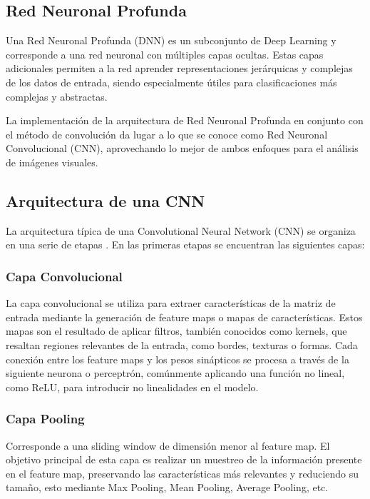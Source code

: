 \documentclass[journal]{IEEEtai}
\begin{document}
\subsection{Red Neuronal Profunda}

Una Red Neuronal Profunda (DNN) es un subconjunto de Deep Learning y corresponde a una red neuronal con múltiples capas ocultas. Estas capas adicionales permiten a la red aprender representaciones jerárquicas y complejas de los datos de entrada, siendo especialmente útiles para clasificaciones más complejas y abstractas.

La implementación de la arquitectura de Red Neuronal Profunda en conjunto con el método de convolución da lugar a lo que se conoce como Red Neuronal Convolucional (CNN), aprovechando lo mejor de ambos enfoques para el análisis de imágenes visuales.

\subsection{Arquitectura de una CNN}

La arquitectura típica de una Convolutional Neural Network (CNN) se organiza en una serie de etapas \cite{CNN}\cite{IntroCNN}. En las primeras etapas se encuentran las siguientes capas:

\subsubsection{\textbf{Capa Convolucional}} La capa convolucional se utiliza para extraer características de la matriz de entrada mediante la generación de feature maps o mapas de características. Estos mapas son el resultado de aplicar filtros, también conocidos como kernels, que resaltan regiones relevantes de la entrada, como bordes, texturas o formas. Cada conexión entre los feature maps y los pesos sinápticos se procesa a través de la siguiente neurona o perceptrón, comúnmente aplicando una función no lineal, como ReLU, para introducir no linealidades en el modelo.
\subsubsection{\textbf{Capa Pooling}} Corresponde a una sliding window de dimensión menor al feature map. El objetivo principal de esta capa es realizar un muestreo de la información presente en el feature map, preservando las características más relevantes y reduciendo su tamaño, esto mediante Max Pooling, Mean Pooling, Average Pooling, etc.
\end{document}
